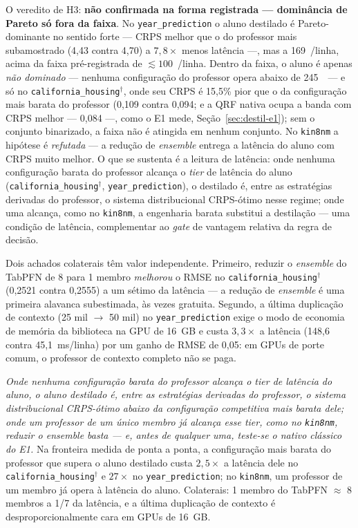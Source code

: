 O veredito de H3: \textbf{não confirmada na forma registrada ---
dominância de Pareto só fora da faixa}. No
\texttt{year\_\allowbreak prediction} o aluno destilado é
Pareto-dominante no sentido forte --- CRPS melhor que o do professor
mais subamostrado (4,43 contra 4,70) a $7{,}8\times$ menos latência
---, mas a 169~\us/linha, acima da faixa pré-registrada de
${\lesssim}100$~\us/linha. Dentro da faixa, o aluno é apenas
\emph{não dominado} --- nenhuma configuração do professor opera
abaixo de 245~\us\ --- e só no
\texttt{california\_\allowbreak housing}$^\dagger$, onde seu CRPS
é 15,5\% pior que o da configuração mais barata do professor (0,109
contra 0,094; e a QRF nativa ocupa a banda com CRPS melhor --- 0,084
---, como o
E1 mede, Seção~\ref{sec:destil-e1}); sem o conjunto binarizado, a faixa não é atingida em
nenhum conjunto. No \texttt{kin8nm} a hipótese é \emph{refutada}
--- a redução de \emph{ensemble} entrega a latência do aluno com
CRPS muito melhor. O que se sustenta é a leitura de latência: onde
nenhuma configuração barata do professor
alcança o \emph{tier} de latência do aluno
(\texttt{california\_\allowbreak housing}$^\dagger$,
\texttt{year\_\allowbreak prediction}), o destilado é, entre as
estratégias derivadas do professor, o sistema distribucional
CRPS-ótimo nesse regime; onde uma alcança, como no
\texttt{kin8nm}, a engenharia barata substitui a destilação --- uma
condição de latência, complementar ao \emph{gate} de vantagem
relativa da regra de decisão.

Dois achados colaterais têm valor independente. Primeiro, reduzir o
\emph{ensemble} do TabPFN de 8 para 1 membro \emph{melhorou} o RMSE no
\texttt{california\_\allowbreak housing}$^\dagger$ (0,2521 contra
0,2555) a um sétimo da
latência --- a redução de \emph{ensemble} é uma primeira alavanca subestimada,
às vezes gratuita. Segundo, a última duplicação de contexto
(25 mil $\to$ 50 mil) no \texttt{year\_\allowbreak prediction} exige o modo de
economia de memória da biblioteca na GPU de 16~GB e custa
$3{,}3\times$ a latência (148,6 contra 45,1~ms/linha) por um ganho de
RMSE de 0,05: em GPUs de porte comum, o professor de contexto completo
não se paga.

\emph{Onde nenhuma configuração barata do professor alcança o
\emph{tier} de latência do aluno, o aluno destilado é,
entre as estratégias derivadas do professor, o sistema distribucional
CRPS-ótimo abaixo da configuração competitiva
mais barata dele; onde um professor de um único membro já alcança
esse \emph{tier}, como no \texttt{kin8nm}, reduzir o
\emph{ensemble} basta ---
e, antes de qualquer uma, teste-se o nativo clássico do E1.} Na
fronteira medida de ponta a ponta, a configuração mais barata do
professor que supera o aluno destilado custa $2{,}5\times$ a latência
dele no \texttt{california\_\allowbreak housing}$^\dagger$ e $27\times$ no
\texttt{year\_\allowbreak prediction}; no \texttt{kin8nm}, um
professor de um membro já opera à latência do aluno. Colaterais: 1
membro do TabPFN $\approx$ 8 membros a 1/7 da latência, e a última
duplicação de contexto é desproporcionalmente cara em GPUs de 16~GB.

